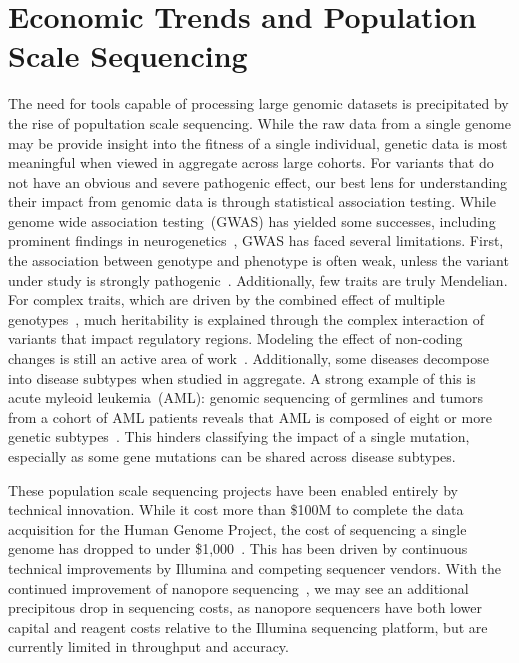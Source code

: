 \documentclass[phd]{ucbthesis}
\begin{document}
\section{Economic Trends and Population Scale Sequencing}
\label{sec:economic-trends-population-scale}

The need for tools capable of processing large genomic datasets is precipitated
by the rise of popultation scale sequencing. While the raw data from a single
genome may be provide insight into the fitness of a single individual, genetic
data is most meaningful when viewed in aggregate across large cohorts.
For variants that do not have an obvious and severe pathogenic effect, our best
lens for understanding their impact from genomic data is through statistical
association testing. While genome wide association testing~(GWAS) has yielded
some successes, including prominent findings in neurogenetics~\cite{ripke14},
GWAS has faced several limitations. First, the association between genotype and
phenotype is often weak, unless the variant under study is strongly
pathogenic~\cite{shi16}. Additionally, few traits are truly Mendelian.
For complex traits, which are driven by the combined effect of multiple
genotypes~\cite{boyle17}, much heritability is explained through the complex
interaction of variants that impact regulatory regions. Modeling the effect of
non-coding changes is still an active area of work~\cite{weingarten14}.
Additionally, some diseases decompose into disease subtypes when studied in
aggregate. A strong example of this is acute myleoid leukemia~(AML): genomic
sequencing of germlines and tumors from a cohort of AML patients reveals
that AML is composed of eight or more genetic subtypes~\cite{aml13}. This
hinders classifying the impact of a single mutation, especially as some
gene mutations can be shared across disease subtypes.

These population scale sequencing projects have been enabled entirely by
technical innovation. While it cost more than \$100M to complete the data
acquisition for the Human Genome Project, the cost of sequencing a single
genome has dropped to under \$1,000~\cite{nhgri}. This has been driven by
continuous technical improvements by Illumina and competing sequencer vendors.
With the continued improvement of nanopore sequencing~\cite{jain17}, we may see
an additional precipitous drop in sequencing costs, as nanopore sequencers have
both lower capital and reagent costs relative to the Illumina sequencing
platform, but are currently limited in throughput and accuracy.
\end{document}
